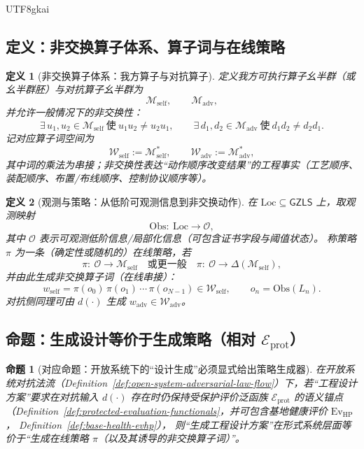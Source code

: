 \documentclass[12pt]{article}
\newtheorem{definition}{定义}[section]
\newtheorem{proposition}{命题}[section]
\newcommand{\GZLS}{\ensuremath{\mathsf{GZLS}}}
\begin{document}
\begin{CJK*}{UTF8}{gkai}
\subsection{定义：非交换算子体系、算子词与在线策略}

\begin{definition}[非交换算子体系：我方算子与对抗算子]
\label{def:noncommutative-operator-systems}
定义我方可执行算子幺半群（或幺半群胚）与对抗算子幺半群为
\[
\mathcal{M}_{\mathrm{self}},
\qquad
\mathcal{M}_{\mathrm{adv}},
\]
并允许一般情况下的非交换性：
\[
\exists\,u_1,u_2\in\mathcal{M}_{\mathrm{self}}\ \text{使}\ u_1u_2\neq u_2u_1,
\qquad
\exists\,d_1,d_2\in\mathcal{M}_{\mathrm{adv}}\ \text{使}\ d_1d_2\neq d_2d_1.
\]
记对应算子词空间为
\[
\mathcal{W}_{\mathrm{self}}:=\mathcal{M}_{\mathrm{self}}^\ast,
\qquad
\mathcal{W}_{\mathrm{adv}}:=\mathcal{M}_{\mathrm{adv}}^\ast,
\]
其中词的乘法为串接；非交换性表达“动作顺序改变结果”的工程事实（工艺顺序、装配顺序、布置/布线顺序、控制协议顺序等）。
\end{definition}

\begin{definition}[观测与策略：从低阶可观测信息到非交换动作]
\label{def:noncommutative-policy}
在 $\mathrm{Loc}\subseteq\GZLS$ 上，取观测映射
\[
\mathrm{Obs}:\ \mathrm{Loc}\to \mathcal{O},
\]
其中 $\mathcal{O}$ 表示可观测低阶信息/局部化信息（可包含证书字段与阈值状态）。
称策略 $\pi$ 为一条（确定性或随机的）在线策略，若
\[
\pi:\ \mathcal{O}\to \mathcal{M}_{\mathrm{self}}
\quad\text{或更一般}\quad
\pi:\ \mathcal{O}\to \Delta(\mathcal{M}_{\mathrm{self}}),
\]
并由此生成非交换算子词（在线串接）：
\[
w_{\mathrm{self}}=\pi(o_0)\,\pi(o_1)\,\cdots\,\pi(o_{N-1})\in \mathcal{W}_{\mathrm{self}},
\qquad
o_n=\mathrm{Obs}(L_n).
\]
对抗侧同理可由 $d(\cdot)$ 生成 $w_{\mathrm{adv}}\in\mathcal{W}_{\mathrm{adv}}$。
\end{definition}

\subsection{命题：生成设计等价于生成策略（相对 $\mathcal{E}_{\mathrm{prot}}$）}

\begin{proposition}[对应命题：开放系统下的“设计生成”必须显式给出策略生成器]
\label{prop:design-generation-equals-strategy-generation}
在开放系统对抗法流（Definition~\ref{def:open-system-adversarial-law-flow}）下，若“工程设计方案”要求在对抗输入 $d(\cdot)$ 存在时仍保持受保护评价泛函族 $\mathcal{E}
  _{\mathrm{prot}}$ 的语义锚点（Definition~\ref{def:protected-evaluation-functionals}，并可包含基地健康评价 $\mathrm{Ev}_{\mathrm{HP}}$，
  Definition~\ref{def:base-health-evhp}），
则“生成工程设计方案”在形式系统层面等价于“生成在线策略 $\pi$（以及其诱导的非交换算子词）”。
\end{proposition}


\end{CJK*}
\end{document}
